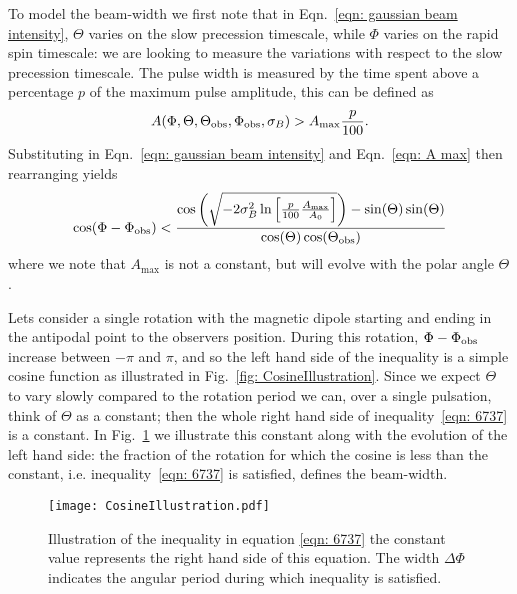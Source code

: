 \documentclass[../full_thesis/full_thesis.tex]{subfiles}
\begin{document}
To model the beam-width we first note that in Eqn.~\eqref{eqn: gaussian beam intensity},
$\Theta$ varies on the slow precession timescale, while $\Phi$ varies on the
rapid spin timescale: we are looking to measure the variations with respect to
the slow precession timescale.  The pulse width is measured by the time spent
above a percentage $p$ of the maximum pulse amplitude, this can be defined as
\begin{align}
A(\Phi, \Theta, \Theta_{\mathrm{obs}}, \Phi_{\mathrm{obs}}, \sigma_{B}) > A_{\textrm{max}} \frac{p}{100}.
\end{align}
Substituting in Eqn.~\eqref{eqn: gaussian beam intensity} and Eqn.~\eqref{eqn: A max}
then rearranging yields
\begin{equation}
\cos(\Phi - \Phi_{\mathrm{obs}}) < \frac{
\cos\left(
\sqrt{-2\sigma_{B}^{2} \ln\left[\frac{p}{100}\frac{A_\textrm{max}}{A_0}\right]}\right) - \sin(\Theta)\sin(\Theta)}
                          {\cos(\Theta)\cos(\Theta_{\mathrm{obs}})}
\label{eqn: 6737}
\end{equation}
where we note that $A_\textrm{max}$ is not a constant, but will evolve with the
polar angle $\Theta$.

Lets consider a single rotation with the magnetic dipole starting and ending in
the antipodal point to the observers position. During this rotation, $\Phi -
\Phi_{\mathrm{obs}}$ increase between $-\pi$ and $\pi$, and so the left hand side of the
inequality is a simple cosine function as illustrated in Fig.~\ref{fig:
CosineIllustration}.  Since we expect $\Theta$ to vary slowly compared to the
rotation period we can, over a single pulsation, think of $\Theta$ as a
constant; then the whole right hand side of inequality~\eqref{eqn: 6737} is a
constant. In Fig.~\ref{fig: CosineIllustration} we illustrate this constant
along with the evolution of the left hand side: the fraction of the rotation
for which the cosine is less than the constant, i.e. inequality~\eqref{eqn: 6737}
is satisfied, defines the beam-width.
\begin{figure}[ht]
\centering
\texttt{[image: CosineIllustration.pdf]}
\caption{Illustration of the inequality in equation \eqref{eqn: 6737} the constant
         value represents the right hand side of this equation. The
         width $\Delta\Phi$ indicates the angular period during which inequality
         is satisfied.}
\label{fig: CosineIllustration}
\end{figure}
\end{document}
